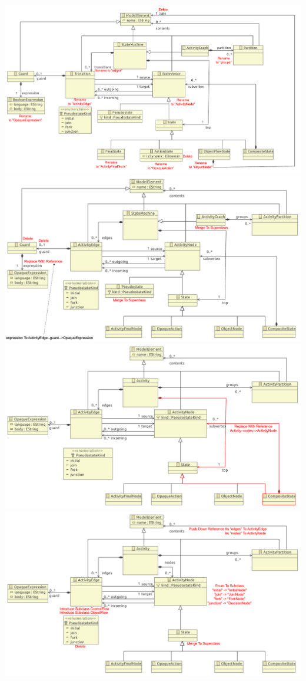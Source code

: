 \documentclass[a4paper,10pt]{article}
\title{}
\author{}
\begin{document}
\includegraphics[width=\textwidth]{0/original_minimal_metamodel_0}
\includegraphics[width=\textwidth]{1/original_minimal_metamodel_1}
\includegraphics[width=\textwidth]{2/original_minimal_metamodel_2}
\includegraphics[width=\textwidth]{3/original_minimal_metamodel_3}
\end{document}

